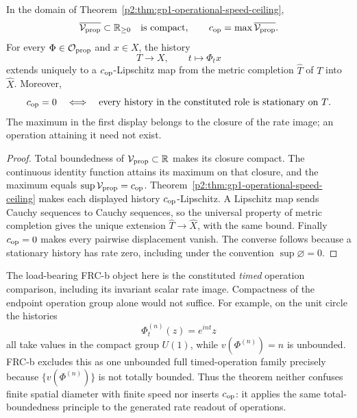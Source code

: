\documentclass[12pt,a4paper]{article}
\begin{document}
\begin{corollary}
\label{p2:cor:gp1-timed-history-completion}
In the domain of
Theorem~\ref{p2:thm:gp1-operational-speed-ceiling},
\[
 \overline{\mathcal V_{\rm prop}}\subset\mathbb R_{\ge0}
 \quad\text{is compact},\qquad
 c_{\rm op}=\max\overline{\mathcal V_{\rm prop}}.
\]
For every \(\Phi\in\mathcal O_{\rm prop}\) and \(x\in X\), the history
\[
        T\longrightarrow X,\qquad t\longmapsto\Phi_t x
\]
extends uniquely to a \(c_{\rm op}\)-Lipschitz map from the metric completion
\(\widehat T\) of \(T\) into \(\widehat X\).  Moreover,
\[
 c_{\rm op}=0
 \quad\Longleftrightarrow\quad
 \text{every history in the constituted role is stationary on \(T\)}.
\]
The maximum in the first display belongs to the closure of the rate image;
an operation attaining it need not exist.
\end{corollary}

\begin{proof}
Total boundedness of \(\mathcal V_{\rm prop}\subset\mathbb R\) makes its
closure compact.  The continuous identity function attains its maximum on
that closure, and the maximum equals
\(\sup\mathcal V_{\rm prop}=c_{\rm op}\).
Theorem~\ref{p2:thm:gp1-operational-speed-ceiling} makes each displayed
history \(c_{\rm op}\)-Lipschitz.  A Lipschitz map sends Cauchy sequences to
Cauchy sequences, so the universal property of metric completion gives the
unique extension \(\widehat T\to\widehat X\), with the same bound.
Finally \(c_{\rm op}=0\) makes every pairwise displacement vanish.  The
converse follows because a stationary history has rate zero, including under
the convention \(\sup\varnothing=0\).
\end{proof}

\begin{remark}
\label{p2:rem:endpoint-compactness-not-speed}
The load-bearing FRC-b object here is the constituted \emph{timed} operation
comparison, including its invariant scalar rate image.  Compactness of the
endpoint operation group alone would not suffice.  For example, on the unit
circle the histories
\[
\Phi_t^{(n)}(z)=e^{int}z
\]
all take values in the compact group \(U(1)\), while
\(v(\Phi^{(n)})=n\) is unbounded.  FRC-b excludes this as one unbounded full
timed-operation family precisely because
\(\{v(\Phi^{(n)})\}\) is not totally bounded.  Thus the theorem neither
confuses finite spatial diameter with finite speed nor inserts
\(c_{\rm op}\): it
applies the same total-boundedness principle to the generated rate readout of
operations.
\end{remark}
\end{document}
